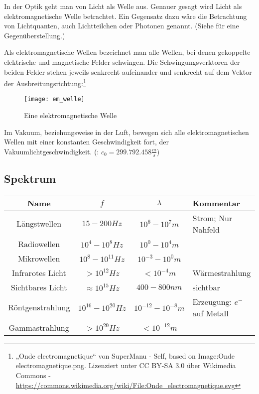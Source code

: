 In der Optik geht man von Licht als Welle aus. Genauer gesagt wird Licht als elektromagnetische Welle betrachtet. Ein Gegensatz dazu wäre die Betrachtung von Lichtquanten, auch Lichtteilchen oder Photonen genannt. (Siehe  für eine Gegenüberstellung.)

Als elektromagnetische Wellen bezeichnet man alle Wellen, bei denen gekoppelte elektrische und magnetische Felder schwingen. Die Schwingungsverktoren der beiden Felder stehen jeweils senkrecht aufeinander und senkrecht auf dem Vektor der Ausbreitungsrichtung:\footnote{„Onde electromagnetique“ von SuperManu - Self, based on Image:Onde electromagnetique.png. Lizenziert unter CC BY-SA 3.0 über Wikimedia Commons - \url{https://commons.wikimedia.org/wiki/File:Onde_electromagnetique.svg}}

\begin{figure}[h!]
	\center
	\texttt{[image: em\_welle]}
	\caption{Eine elektromagnetische Welle}
	\label{fig:emwelle}
\end{figure}

Im Vakuum, beziehungsweise in der Luft, bewegen sich alle elektromagnetischen Wellen mit einer konstanten Geschwindigkeit fort, der Vakuumlichtgeschwindigkeit. (: $c_0=299.792.458 \frac{m}{s}$)

\subsection{Spektrum}
\hspace*{-25pt}
\begin{tabular}[c]{|c|c|c|l|}
	\hline
	Name				&	$f$						& $\lambda$ 	& Kommentar\\
	\hline
	Längstwellen		&	$15-200Hz$				& $10^6-10^7m$ & Strom; Nur Nahfeld\\
	Radiowellen			&	$10^4-10^8Hz$			& $10^0-10^4m$ & \\
	Mikrowellen			&	$10^8-10^{11}Hz$		& $10^{-3}-10^{0}m$ & \\
	Infrarotes Licht	&	$>10^{12}Hz$			& $<10^{-4}m$ & \glqq Wärmestrahlung\grqq \\
	Sichtbares Licht	&	$\approx 10^{15}Hz$		& $400-800nm$ & sichtbar\\
	Röntgenstrahlung	&	$10^{16} - 10^{20}Hz$	& $10^{-12}-10^{-8}m$ & Erzeugung: $e^{-}$ auf Metall \\
	Gammastrahlung		&	$>10^{20}Hz$			& $<10^{-12}m$ & \\
	\hline
\end{tabular}